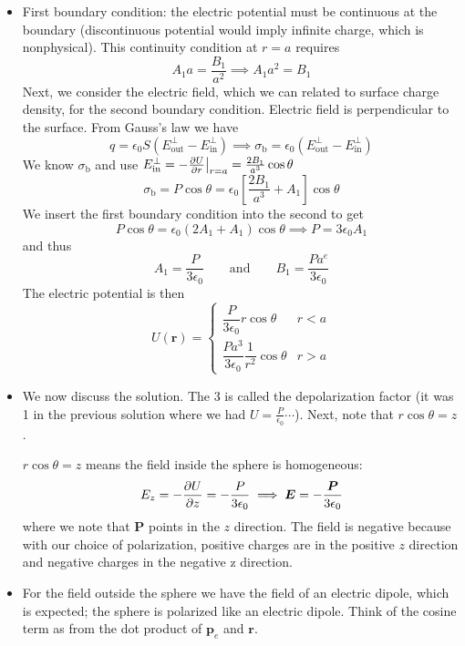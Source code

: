 \documentclass[11pt, a4paper]{article}
\newcommand{\eqtext}[1]{\qquad \text{#1} \qquad}
\renewcommand{\vec}[1]{\bm{#1}} %
\renewcommand{\r}{\vec{r}}
\newcommand{\E}{\vec{E}}  %
\newcommand{\ee}{\epsilon_{0}}  %
\newcommand{\pe}{\vec{p}_{e}}  %
\renewcommand{\P}{\vec{P}}  %
\begin{document}
\begin{itemize}
	\item First boundary condition: the electric potential must be continuous at the boundary (discontinuous potential would imply infinite charge, which is nonphysical). This continuity condition at $ r = a $ requires
	\begin{equation*}
		A_{1}a = \frac{B_{1}}{a^{2}} \implies A_{1}a^{2} = B_{1}
	\end{equation*}
	Next, we consider the electric field, which we can related to surface charge density, for the second boundary condition. Electric field is perpendicular to the surface. From Gauss's law we have
	\begin{equation*}
		q = \ee S (E_{\text{out}}^{\perp} - E_{\text{in}}^{\perp})  \implies \sigma_{\text{b}} = \ee (E_{\text{out}}^{\perp} - E_{\text{in}}^{\perp})
	\end{equation*}
	We know $ \sigma_{\text{b}} $ and use $ E_{\text{in}}^{\perp} = - \pdv{U}{r}\big |_{r = a} = \frac{2B_{1}}{a^{3}}\cos \theta $
	\begin{equation*}
		\sigma_{\text{b}} = P\cos \theta = \ee \left[  \frac{2B_{1}}{a^{3}} + A_{1}\right]\cos \theta 
	\end{equation*}
	We insert the first boundary condition into the second to get
	\begin{equation*}
		P \cos \theta = \ee \left(2A_{1} + A_{1}\right)\cos \theta \implies P = 3 \ee A_{1} 
	\end{equation*}
	and thus
	\begin{equation*}
		A_{1} = \frac{P}{3\ee} \eqtext{and} B_{1} = \frac{Pa^{e}}{3\ee}
	\end{equation*}
	The electric potential is then
	\begin{equation*}
		U(\r) = 
		\begin{cases}
			\dfrac{P}{3\ee} r \cos \theta & r < a\\[2mm]
			\dfrac{Pa^{3}}{3\ee}\dfrac{1}{r^{2}}\cos \theta & r > a
		\end{cases}
	\end{equation*}
	
	\item We now discuss the solution. The 3 is called the depolarization factor (it was 1 in the previous solution where we had $ U = \frac{P}{\ee}\cdots $). Next, note that $ r \cos \theta = z $. 
	
	$ r \cos \theta = z $ means the field inside the sphere is homogeneous:
	\begin{equation*}
		E_{z} = - \pdv{U}{z} = -\frac{P}{3\ee} \implies \E = - \frac{\P}{3\ee}
	\end{equation*}
	where we note that $ \P $ points in the $ z $ direction. The field is negative because with our choice of polarization, positive charges are in the positive $ z $ direction and negative charges in the negative z direction. 
	
	\item For the field outside the sphere we have the field of an electric dipole, which is expected; the sphere is polarized like an electric dipole. Think of the cosine term as from the dot product of $ \pe $ and $ \r $. 
	
\end{itemize}
\end{document}
